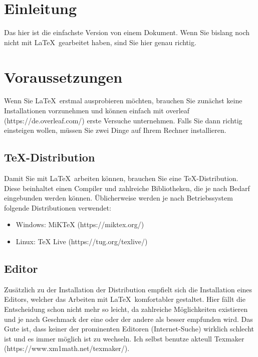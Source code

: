\documentclass[12pt,a4paper]{scrartcl}
\begin{document}
%
\section{Einleitung}
Das hier ist die einfachste Version von einem Dokument. 
Wenn Sie bislang noch nicht mit \LaTeX\, gearbeitet haben, sind Sie hier genau richtig.
%
\section{Voraussetzungen}
Wenn Sie \LaTeX\, erstmal ausprobieren möchten, brauchen Sie zunächst keine Installationen vorzunehmen und können einfach mit overleaf (https://de.overleaf.com/) erste Versuche unternehmen.
Falls Sie dann richtig einsteigen wollen, müssen Sie zwei Dinge auf Ihrem Rechner installieren.
%
\subsection{TeX-Distribution}
Damit Sie mit \LaTeX\, arbeiten können, brauchen Sie eine TeX-Distribution.
Diese beinhaltet einen Compiler und zahlreiche Bibliotheken, die je nach Bedarf eingebunden werden können.
Üblicherweise werden je nach Betriebssystem folgende Distributionen verwendet:
%
\begin{itemize}
\item Windows: MiKTeX (https://miktex.org/)
\item Linux: TeX Live (https://tug.org/texlive/)
\end{itemize}
%
\subsection{Editor}
Zusätzlich zu der Installation der Distribution empfielt sich die Installation eines Editors, welcher das Arbeiten mit \LaTeX\, komfortabler gestaltet. 
Hier fällt die Entscheidung schon nicht mehr so leicht, da zahlreiche Möglichkeiten existieren und je nach Geschmack der eine oder der andere als besser empfunden wird.
Das Gute ist, dass keiner der prominenten Editoren (Internet-Suche) wirklich schlecht ist und es immer möglich ist zu wechseln.
Ich selbst benutze akteull Texmaker (https://www.xm1math.net/texmaker/).
%
\end{document}
